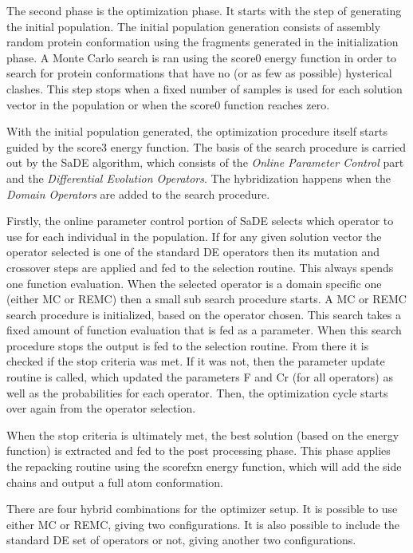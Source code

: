The second phase is the optimization phase.  It starts with the step of
generating the initial population. The initial population generation consists
of assembly random protein conformation using the fragments generated in the
initialization phase. A Monte Carlo search is ran using the score0 energy
function in order to search for protein conformations that have no (or as few
as possible) hysterical clashes. This step stops when a fixed number of samples
is used for each solution vector in the population or when the score0 function
reaches zero.

With the initial population generated, the optimization procedure itself starts
guided by the score3 energy function. The basis of the search procedure is
carried out by the \ac{SaDE} algorithm, which consists of the \textit{Online
Parameter Control} part and the \textit{Differential Evolution Operators}. The
hybridization happens when the \textit{Domain Operators} are added to the
search procedure.

Firstly, the online parameter control portion of \ac{SaDE} selects which
operator to use for each individual in the population.  If for any given
solution vector the operator selected is one of the standard DE operators then
its mutation and crossover steps are applied and fed to the selection routine.
This always spends one function evaluation. When the selected operator is a
domain specific one (either \ac{MC} or \ac{REMC}) then a small sub search
procedure starts.  A \ac{MC} or \ac{REMC} search procedure is initialized,
based on the operator chosen.  This search takes a fixed amount of function
evaluation that is fed as a parameter.  When this search procedure stops the
output is fed to the selection routine.  From there it is checked if the stop
criteria was met. If it was not, then the parameter update routine is called,
which updated the parameters F and Cr (for all operators) as well as the
probabilities for each operator. Then, the optimization cycle starts over again
from the operator selection.

When the stop criteria is ultimately met, the best solution (based on the
energy function) is extracted and fed to the post processing phase.  This phase
applies the repacking routine using the scorefxn energy function, which will
add the side chains and output a full atom conformation.

There are four hybrid combinations for the optimizer setup. It is possible to
use either \ac{MC} or \ac{REMC}, giving two configurations. It is also possible
to include the standard DE set of operators or not, giving another two
configurations.
